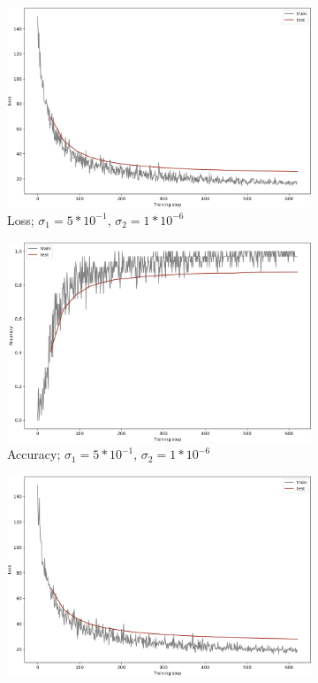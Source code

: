 \begin{figure}[]
\begin{subfigure}[b]{0.48\textwidth}
         \includegraphics[width=\textwidth]{observational/img/bnn/sigmas/LC_s0.5_s1e-06.png}
         \caption{Loss; $\sigma_1=5*10^{-1}$, $\sigma_2=1*10^{-6}$}
     \end{subfigure}
     \hfill
     \begin{subfigure}[b]{0.48\textwidth}
         \centering
         \includegraphics[width=\textwidth]{observational/img/bnn/sigmas/AC_s0.5_s1e-06.png}
         \caption{Accuracy; $\sigma_1=5*10^{-1}$, $\sigma_2=1*10^{-6}$}
     \end{subfigure} 
     \par\bigskip
     \begin{subfigure}[b]{0.48\textwidth}
         \centering
         \includegraphics[width=\textwidth]{observational/img/bnn/sigmas/LC_default.png}

\end{subfigure}
\end{figure}
